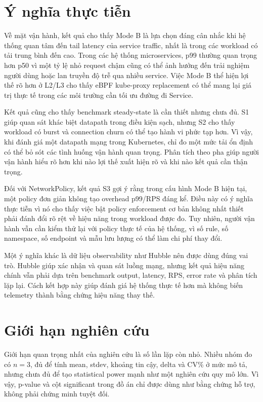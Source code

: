 \section{Ý nghĩa thực tiễn}

Về mặt vận hành, kết quả cho thấy Mode B là lựa chọn đáng cân nhắc khi hệ thống quan tâm đến tail latency của service traffic, nhất là trong các workload có tải trung bình đến cao. Trong các hệ thống microservices, p99 thường quan trọng hơn p50 vì một tỷ lệ nhỏ request chậm cũng có thể ảnh hưởng đến trải nghiệm người dùng hoặc lan truyền độ trễ qua nhiều service. Việc Mode B thể hiện lợi thế rõ hơn ở L2/L3 cho thấy eBPF kube-proxy replacement có thể mang lại giá trị thực tế trong các môi trường cần tối ưu đường đi Service.

Kết quả cũng cho thấy benchmark steady-state là cần thiết nhưng chưa đủ. S1 giúp quan sát khác biệt datapath trong điều kiện sạch, nhưng S2 cho thấy workload có burst và connection churn có thể tạo hành vi phức tạp hơn. Vì vậy, khi đánh giá một datapath mạng trong Kubernetes, chỉ đo một mức tải ổn định có thể bỏ sót các tình huống vận hành quan trọng. Phân tích theo pha giúp người vận hành hiểu rõ hơn khi nào lợi thế xuất hiện rõ và khi nào kết quả cần thận trọng.

Đối với NetworkPolicy, kết quả S3 gợi ý rằng trong cấu hình Mode B hiện tại, một policy đơn giản không tạo overhead p99/RPS đáng kể. Điều này có ý nghĩa thực tiễn vì nó cho thấy việc bật policy enforcement cơ bản không nhất thiết phải đánh đổi rõ rệt về hiệu năng trong workload được đo. Tuy nhiên, người vận hành vẫn cần kiểm thử lại với policy thực tế của hệ thống, vì số rule, số namespace, số endpoint và mẫu lưu lượng có thể làm chi phí thay đổi.

Một ý nghĩa khác là dữ liệu observability như Hubble nên được dùng đúng vai trò. Hubble giúp xác nhận và quan sát luồng mạng, nhưng kết quả hiệu năng chính vẫn phải dựa trên benchmark output, latency, RPS, error rate và phân tích lặp lại. Cách kết hợp này giúp đánh giá hệ thống thực tế hơn mà không biến telemetry thành bằng chứng hiệu năng thay thế.

\section{Giới hạn nghiên cứu}

Giới hạn quan trọng nhất của nghiên cứu là số lần lặp còn nhỏ. Nhiều nhóm đo có \(n=3\), đủ để tính mean, stdev, khoảng tin cậy, delta và CV\% ở mức mô tả, nhưng chưa đủ để tạo statistical power mạnh như một nghiên cứu quy mô lớn. Vì vậy, p-value và cột significant trong đồ án chỉ được dùng như bằng chứng hỗ trợ, không phải chứng minh tuyệt đối.

